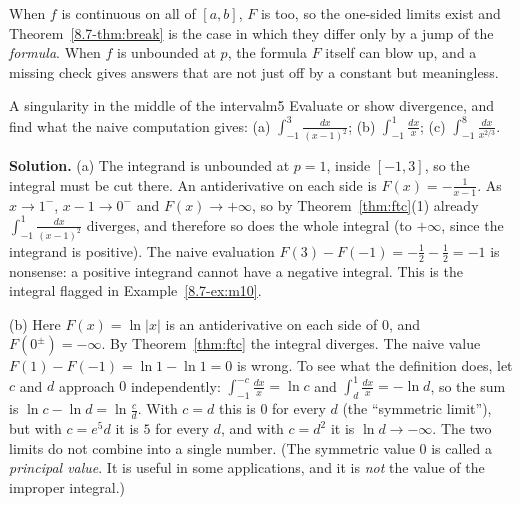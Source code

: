 \documentclass[11pt]{article}
\begin{document}
When $f$ is continuous on all of $[a,b]$, $F$ is too, so the one-sided limits exist and Theorem~\ref{8.7-thm:break} is the case in which they differ only by a jump of the \emph{formula}. When $f$ is unbounded at $p$, the formula $F$ itself can blow up, and a missing check gives answers that are not just off by a constant but meaningless.

\begin{exmp}{A singularity in the middle of the interval}{m5}
Evaluate or show divergence, and find what the naive computation gives: (a) $\displaystyle\int_{-1}^3\frac{dx}{(x-1)^2}$; (b) $\displaystyle\int_{-1}^1\frac{dx}x$; (c) $\displaystyle\int_{-1}^8\frac{dx}{x^{2/3}}$.

\textbf{Solution.} (a) The integrand is unbounded at $p=1$, inside $[-1,3]$, so the integral must be cut there. An antiderivative on each side is $F(x)=-\frac1{x-1}$. As $x\to1^-$, $x-1\to0^-$ and $F(x)\to+\infty$, so by Theorem~\ref{thm:ftc}(1) already $\int_{-1}^1\frac{dx}{(x-1)^2}$ diverges, and therefore so does the whole integral (to $+\infty$, since the integrand is positive). The naive evaluation $F(3)-F(-1)=-\frac12-\frac12=-1$ is nonsense: a positive integrand cannot have a negative integral. This is the integral flagged in Example~\ref{8.7-ex:m10}.

(b) Here $F(x)=\ln\lvert x\rvert$ is an antiderivative on each side of $0$, and $F(0^\pm)=-\infty$. By Theorem~\ref{thm:ftc} the integral diverges. The naive value $F(1)-F(-1)=\ln1-\ln1=0$ is wrong. To see what the definition does, let $c$ and $d$ approach $0$ independently: $\int_{-1}^{-c}\frac{dx}x=\ln c$ and $\int_d^1\frac{dx}x=-\ln d$, so the sum is $\ln c-\ln d=\ln\frac cd$. With $c=d$ this is $0$ for every $d$ (the ``symmetric limit''), but with $c=e^5d$ it is $5$ for every $d$, and with $c=d^2$ it is $\ln d\to-\infty$. The two limits do not combine into a single number.
(The symmetric value $0$ is called a \emph{principal value}. It is useful in some applications, and it is \emph{not} the value of the improper integral.)


\end{exmp}
\end{document}
